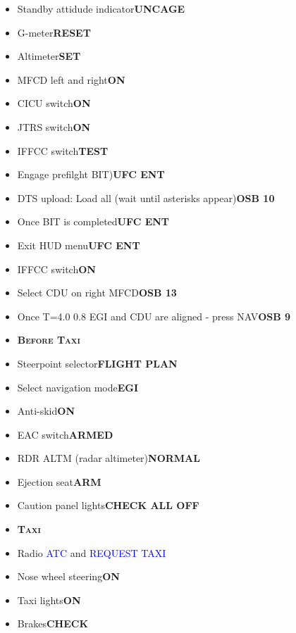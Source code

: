 \documentclass[a4paper,12pt,dvipsnames]{letter}
\newcommand{\radio}[1]{\textcolor{blue}{#1}}
\newcommand{\button}[1]{\textbf{#1}}
\newcommand{\myHead}[1]{{\LARGE\textsc{\textbf{#1}}}}
\begin{document}
{\begin{itemize}
 \item Standby attidude indicator\dotfill\button{UNCAGE}
 \item G-meter\dotfill\button{RESET}
 \item Altimeter\dotfill\button{SET}
 \item MFCD left and right\dotfill\button{ON}
 \item CICU switch\dotfill\button{ON}
 \item JTRS switch\dotfill\button{ON}
 \item IFFCC switch\dotfill\button{TEST}
 \item Engage prefilght BIT)\dotfill\button{UFC ENT}
 \item DTS upload: Load all (wait until asterisks appear)\dotfill\button{OSB 10}
 \item Once BIT is completed\dotfill\button{UFC ENT}
 \item Exit HUD menu\dotfill\button{UFC ENT}
 \item IFFCC switch\dotfill\button{ON}
 \item Select CDU on right MFCD\dotfill\button{OSB 13}
 \item Once T=4.0 0.8 EGI and CDU are aligned - press NAV\dotfill\button{OSB 9}
\end{itemize}
\newpage
\begin{itemize}
 \item[] \myHead{Before Taxi}
 \item Steerpoint selector\dotfill\button{FLIGHT PLAN}
 \item Select navigation mode\dotfill\button{EGI}
 \item Anti-skid\dotfill\button{ON}
 \item EAC switch\dotfill\button{ARMED}
 \item RDR ALTM (radar altimeter)\dotfill\button{NORMAL}
 \item Ejection seat\dotfill\button{ARM}
 \item Caution panel lights\dotfill\button{CHECK ALL OFF}
\end{itemize}
\begin{itemize}
 \item[] \myHead{Taxi}
 \item Radio \radio{ATC} and \radio{REQUEST TAXI}
 \item Nose wheel steering\dotfill\button{ON}
 \item Taxi lights\dotfill\button{ON}
 \item Brakes\dotfill\button{CHECK}

\end{itemize}}
\end{document}
